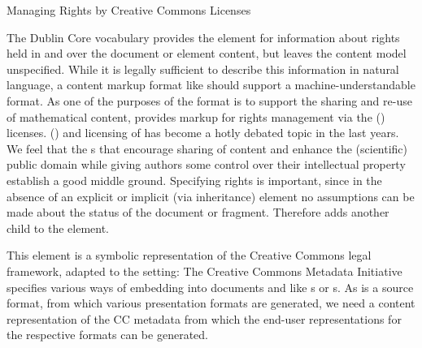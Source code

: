 
\begin{module}[id=cc]
\begin{omgroup}[id=creativecommons,short=Managing Rights]
                           {Managing Rights by Creative Commons Licenses}

The Dublin Core vocabulary provides the  element for
information about rights held in and over the document or element content, but leaves the
content model unspecified. While it is legally sufficient to describe this information in
natural language, a content markup format like \omdoc should support a
machine-understandable format. As one of the purposes of the \omdoc format is to support
the sharing and re-use of mathematical content, \omdoc provides markup for rights
management via the {}
({}) licenses.   () and licensing of
{} has become a hotly debated topic in the last years. We
feel that the {s} that encourage sharing of content and
enhance the (scientific) public domain while giving authors some control over their
intellectual property establish a good middle ground. Specifying rights is important,
since in the absence of an explicit or implicit (via inheritance)
 element no assumptions can be made about the status of the
document or fragment.  Therefore \omdoc adds another child to the 
element.  

This  element is a symbolic representation of the Creative
Commons legal framework, adapted to the \omdoc setting: The Creative Commons Metadata
Initiative specifies various ways of embedding {} into documents and
{} like {s} or
{s}. As \omdoc is a source format, from which various
presentation formats are generated, we need a content representation of the CC metadata
from which the end-user representations for the respective formats can be generated.


\end{omgroup}
\end{module}
